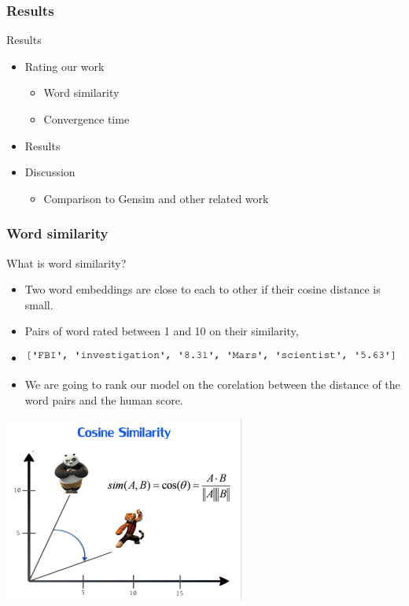 \begin{frame}\frametitle{Results}
\begin{Large}
Results
\end{Large}
\begin{itemize}
\item Rating our work
\begin{itemize}
\item Word similarity 
\item Convergence time
\end{itemize}
\item Results
\item Discussion
\begin{itemize}
\item Comparison to Gensim and other related work
\end{itemize}
\end{itemize}
\end{frame}

\begin{frame}
\frametitle{Word similarity}
\begin{Large}
What is word similarity? 
\end{Large}
\medskip
\begin{itemize}
\item Two word embeddings are close to each to other if their cosine distance is small. 
\item Pairs of word rated between 1 and 10 on their similarity, 
\item \includegraphics[scale=0.5]{images/wordsim353_example}
\item We are going to rank our model on the corelation between the distance of the word pairs and the human score.
\end{itemize}
\centerline{ \includegraphics[scale=0.4]{images/cosine}}
\end{frame}

